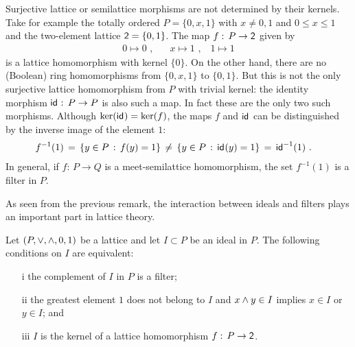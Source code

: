 \begin{remarkKerIsNotEnough}
	Surjective lattice or semilattice morphisms are not determined by
	their kernels. Take for example the totally ordered $P=\{0,x,1\}$
	with $x\not =0,1$ and $0\leq x\leq 1$ and the two-element lattice
	$\mathsf{2}=\{0,1\}$. The map $f:\,P\rightarrow\mathsf{2}$ given by
	\begin{align*}
		0\mapsto 0\text{ ,} \quad &
			x\mapsto 1\text{ ,} \quad
			1\mapsto 1
	\end{align*}
	is a lattice homomorphism with kernel $\{0\}$. On the other hand,
	there are no (Boolean) ring homomorphisms from $\{0,x,1\}$ to
	$\{0,1\}$. But this is not the only surjective lattice homomorphism
	from $P$ with trivial kernel: the identity morphism
	$\mathsf{id}_{}:\,P\rightarrow P$ is also such a map. In fact these are the
	only two such morphisms. Although $\ker(\mathsf{id}_{})=\ker(f)$, the maps
	$f$ and $\mathsf{id}_{}$ can be distinguished by the inverse image of the
	element $1$:
	\begin{align*}
		f^{-1}(1) & \,=\, \left\lbrace y\in P\,:\,f(y)=1\right\rbrace
			\,\not=\,\left\lbrace y\in P\,:\,\mathsf{id}_{}(y)=1\right\rbrace
			\,=\,\mathsf{id}_{}^{-1}(1)
		\text{ .}
	\end{align*}
	In general, if $f:\,P\rightarrow Q$ is a meet-semilattice
	homomorphism, the set $f^{-1}(1)$ is a filter in $P$.
\end{remarkKerIsNotEnough}

As seen from the previous remark, the interaction between ideals and
filters plays an important part in lattice theory.

\begin{propoLatPrimeIdeal}\label{thm:latprimeideal}
	Let $(P,\vee,\wedge,0,1)$ be a lattice and let $I\subset P$
	be an ideal in $P$. The following conditions on $I$ are equivalent:
	\begin{itemize}
		\item[i] the complement of $I$ in $P$ is a filter;
		\item[ii] the greatest element $1$ does not belong to $I$
			and $x\wedge y\in I$ implies $x\in I$ or $y\in I$;
			and
		\item[iii] $I$ is the kernel of a lattice homomorphism
			$f:\,P\rightarrow\mathsf{2}$.
	\end{itemize}
\end{propoLatPrimeIdeal}

